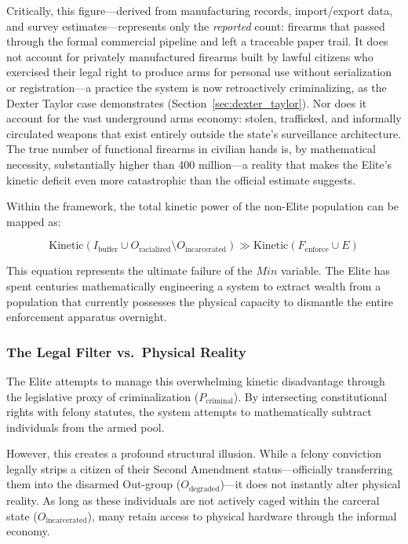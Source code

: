 \documentclass[12pt,openany]{book}
\begin{document}
Critically, this figure---derived from manufacturing records, import/export data, and survey estimates---represents only the \textit{reported} count: firearms that passed through the formal commercial pipeline and left a traceable paper trail. It does not account for privately manufactured firearms built by lawful citizens who exercised their legal right to produce arms for personal use without serialization or registration---a practice the system is now retroactively criminalizing, as the Dexter Taylor case demonstrates (Section~\ref{sec:dexter_taylor}). Nor does it account for the vast underground arms economy: stolen, trafficked, and informally circulated weapons that exist entirely outside the state's surveillance architecture. The true number of functional firearms in civilian hands is, by mathematical necessity, substantially higher than 400 million---a reality that makes the Elite's kinetic deficit even more catastrophic than the official estimate suggests.

Within the framework, the total kinetic power of the non-Elite population can be mapped as:

\[
\text{Kinetic}(I_{\text{buffer}} \cup O_{\text{racialized}} \setminus O_{\text{incarcerated}}) \gg \text{Kinetic}(F_{\text{enforce}} \cup E)
\]

This equation represents the ultimate failure of the $Min$ variable. The Elite has spent centuries mathematically engineering a system to extract wealth from a population that currently possesses the physical capacity to dismantle the entire enforcement apparatus overnight.

\subsubsection*{The Legal Filter vs.\ Physical Reality}

The Elite attempts to manage this overwhelming kinetic disadvantage through the legislative proxy of criminalization ($P_{\text{criminal}}$). By intersecting constitutional rights with felony statutes, the system attempts to mathematically subtract individuals from the armed pool.

However, this creates a profound structural illusion. While a felony conviction legally strips a citizen of their Second Amendment status---officially transferring them into the disarmed Out-group ($O_{\text{degraded}}$)---it does not instantly alter physical reality. As long as these individuals are not actively caged within the carceral state ($O_{\text{incarcerated}}$), many retain access to physical hardware through the informal economy.
\end{document}
